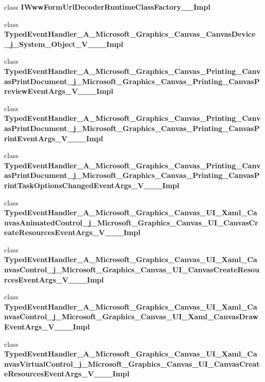 \begin{DoxyCompactItemize}
\item 
class {\bfseries I\+Www\+Form\+Url\+Decoder\+Runtime\+Class\+Factory\+\_\+\+\_\+\+Impl}
\item 
class {\bfseries Typed\+Event\+Handler\+\_\+\+A\+\_\+\+Microsoft\+\_\+\+Graphics\+\_\+\+Canvas\+\_\+\+Canvas\+Device\+\_\+j\+\_\+\+System\+\_\+\+Object\+\_\+\+V\+\_\+\+\_\+\+\_\+\+Impl}
\item 
class {\bfseries Typed\+Event\+Handler\+\_\+\+A\+\_\+\+Microsoft\+\_\+\+Graphics\+\_\+\+Canvas\+\_\+\+Printing\+\_\+\+Canvas\+Print\+Document\+\_\+j\+\_\+\+Microsoft\+\_\+\+Graphics\+\_\+\+Canvas\+\_\+\+Printing\+\_\+\+Canvas\+Preview\+Event\+Args\+\_\+\+V\+\_\+\+\_\+\+\_\+\+Impl}
\item 
class {\bfseries Typed\+Event\+Handler\+\_\+\+A\+\_\+\+Microsoft\+\_\+\+Graphics\+\_\+\+Canvas\+\_\+\+Printing\+\_\+\+Canvas\+Print\+Document\+\_\+j\+\_\+\+Microsoft\+\_\+\+Graphics\+\_\+\+Canvas\+\_\+\+Printing\+\_\+\+Canvas\+Print\+Event\+Args\+\_\+\+V\+\_\+\+\_\+\+\_\+\+Impl}
\item 
class {\bfseries Typed\+Event\+Handler\+\_\+\+A\+\_\+\+Microsoft\+\_\+\+Graphics\+\_\+\+Canvas\+\_\+\+Printing\+\_\+\+Canvas\+Print\+Document\+\_\+j\+\_\+\+Microsoft\+\_\+\+Graphics\+\_\+\+Canvas\+\_\+\+Printing\+\_\+\+Canvas\+Print\+Task\+Options\+Changed\+Event\+Args\+\_\+\+V\+\_\+\+\_\+\+\_\+\+Impl}
\item 
class {\bfseries Typed\+Event\+Handler\+\_\+\+A\+\_\+\+Microsoft\+\_\+\+Graphics\+\_\+\+Canvas\+\_\+\+U\+I\+\_\+\+Xaml\+\_\+\+Canvas\+Animated\+Control\+\_\+j\+\_\+\+Microsoft\+\_\+\+Graphics\+\_\+\+Canvas\+\_\+\+U\+I\+\_\+\+Canvas\+Create\+Resources\+Event\+Args\+\_\+\+V\+\_\+\+\_\+\+\_\+\+Impl}
\item 
class {\bfseries Typed\+Event\+Handler\+\_\+\+A\+\_\+\+Microsoft\+\_\+\+Graphics\+\_\+\+Canvas\+\_\+\+U\+I\+\_\+\+Xaml\+\_\+\+Canvas\+Control\+\_\+j\+\_\+\+Microsoft\+\_\+\+Graphics\+\_\+\+Canvas\+\_\+\+U\+I\+\_\+\+Canvas\+Create\+Resources\+Event\+Args\+\_\+\+V\+\_\+\+\_\+\+\_\+\+Impl}
\item 
class {\bfseries Typed\+Event\+Handler\+\_\+\+A\+\_\+\+Microsoft\+\_\+\+Graphics\+\_\+\+Canvas\+\_\+\+U\+I\+\_\+\+Xaml\+\_\+\+Canvas\+Control\+\_\+j\+\_\+\+Microsoft\+\_\+\+Graphics\+\_\+\+Canvas\+\_\+\+U\+I\+\_\+\+Xaml\+\_\+\+Canvas\+Draw\+Event\+Args\+\_\+\+V\+\_\+\+\_\+\+\_\+\+Impl}
\item 
class {\bfseries Typed\+Event\+Handler\+\_\+\+A\+\_\+\+Microsoft\+\_\+\+Graphics\+\_\+\+Canvas\+\_\+\+U\+I\+\_\+\+Xaml\+\_\+\+Canvas\+Virtual\+Control\+\_\+j\+\_\+\+Microsoft\+\_\+\+Graphics\+\_\+\+Canvas\+\_\+\+U\+I\+\_\+\+Canvas\+Create\+Resources\+Event\+Args\+\_\+\+V\+\_\+\+\_\+\+\_\+\+Impl}

\end{DoxyCompactItemize}
